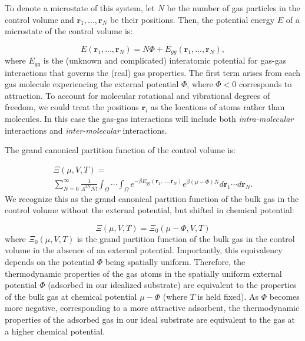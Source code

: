 \documentclass[twoside,twocolumn,9pt]{article}
\newcommand{\rvec}{\mathbf{r}}
\newcommand\V{\Phi}
\begin{document}
To denote a microstate of this system, let $N$ be the number of gas particles
in the control volume and $\mathbf{r}_1,...,\mathbf{r}_N$ be their positions.
Then, the potential energy $E$ of a microstate of the control volume is:

\begin{equation} E(\rvec_1,...,\rvec_N) = N\V +
E_{gg}(\rvec_1,...,\rvec_N),
\end{equation}
where $E_{gg}$ is the (unknown and complicated) interatomic potential for
gas-gas interactions that governs the (real) gas properties. The first term
arises from each gas molecule experiencing the external potential $\V$, where
$\V < 0$ corresponds to attraction. To account for molecular rotational and
vibrational degrees of freedom, we could treat the positions $\rvec_i$ as the
locations of atoms rather than molecules. In this case the gas-gas interactions
will include both \emph{intra-molecular} interactions and
\emph{inter-molecular} interactions.

The grand canonical partition function of the control volume is:

\begin{multline}
    \Xi(\mu, V, T)= \\ \displaystyle \sum_{N=0}^\infty \frac{1}{\Lambda^{3N}N!} \int_{\Omega} \cdots \int_{\Omega} e^{-\beta E_{gg}(\rvec_1, ..., \rvec_N)} e^{\beta (\mu - \V) N} d\rvec_1 \cdots d\rvec_N.
    \label{eq:gcpf}
\end{multline}
We recognize this as the grand canonical partition function of the bulk gas in
the control volume without the external potential, but shifted in chemical
potential:

\begin{equation}
    \Xi(\mu, V, T)=\Xi_0(\mu - \V, V, T)
    \label{eq:xi_vs_xi0}
\end{equation}
where $\Xi_0(\mu, V, T)$ is the grand partition function of the bulk
gas in the control volume in the absence of an external potential. Importantly,
this equivalency depends on the potential $\V$ being spatially uniform.
Therefore, the thermodynamic properties of the gas atoms in the spatially
uniform external potential $\V$ (adsorbed in our idealized substrate)
are equivalent to the properties of the bulk gas at chemical potential $\mu-\V$
(where $T$ is held fixed). As $\V$ becomes more negative, corresponding to a
more attractive adsorbent, the thermodynamic properties of the adsorbed gas in
our ideal substrate are equivalent to the gas at a higher chemical potential.
\end{document}
